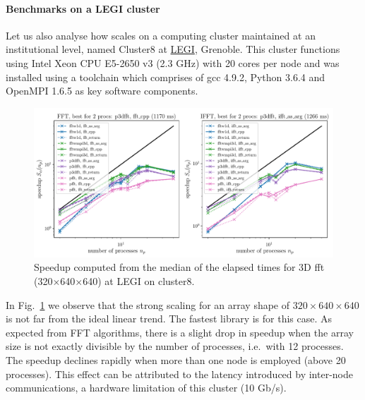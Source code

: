 \paragraph{Benchmarks on a LEGI cluster}

Let us also analyse how  scales on a computing cluster
maintained at an institutional level, named Cluster8 at \href{%
http://www.legi.grenoble-inp.fr}{LEGI}, Grenoble. This cluster functions using
Intel Xeon CPU E5-2650 v3 (2.3 GHz) with 20 cores per node and 
was installed using a toolchain which comprises of gcc 4.9.2, Python 3.6.4 and
OpenMPI 1.6.5 as key software components.

\begin{figure}[htp!]
\centering
\includegraphics[width=\linewidth]{tmp/fig_legi_cluster8_320x640x640}
\caption{Speedup computed from the median of the elapsed times for 3D fft
(320$\times$640$\times$640) at LEGI on cluster8.}
\label{fig:cluster8:320x640x640}
\end{figure}

In Fig.~\ref{fig:cluster8:320x640x640} we observe that the strong scaling for an
array shape of $320\times640\times640$ is not far from the ideal linear trend. The
fastest library is  for this case.  As expected from FFT
algorithms, there is a slight drop in speedup when the array size is not exactly
divisible by the number of processes, i.e.\ with 12 processes. The speedup
declines rapidly when more than one node is employed (above 20 processes). This
effect can be attributed to the latency introduced by inter-node communications, a
hardware limitation of this cluster (10 Gb/s).

